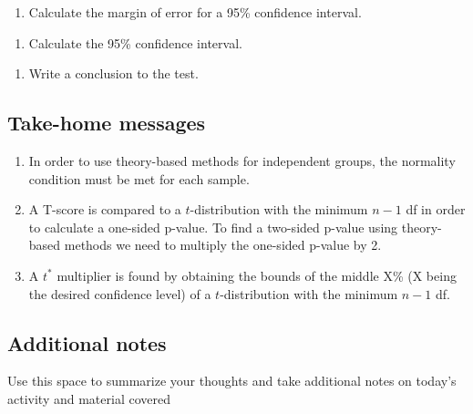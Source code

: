 \documentclass[
]{report}
\providecommand{\tightlist}{%
  \setlength{\itemsep}{0pt}\setlength{\parskip}{0pt}}
\begin{document}
\begin{enumerate}
\def\labelenumi{\arabic{enumi}.}
\setcounter{enumi}{8}
\tightlist
\item
  Calculate the margin of error for a 95\% confidence interval.
\end{enumerate}

\vspace{0.5in}

\begin{enumerate}
\def\labelenumi{\arabic{enumi}.}
\setcounter{enumi}{9}
\tightlist
\item
  Calculate the 95\% confidence interval.
\end{enumerate}

\vspace{0.6in}

\begin{enumerate}
\def\labelenumi{\arabic{enumi}.}
\setcounter{enumi}{10}
\tightlist
\item
  Write a conclusion to the test.
  \vspace{0.7in}
\end{enumerate}

\subsection{Take-home messages}\label{take-home-messages-1}

\begin{enumerate}
\def\labelenumi{\arabic{enumi}.}
\item
  In order to use theory-based methods for independent groups, the normality condition must be met for each sample.
\item
  A T-score is compared to a \(t\)-distribution with the minimum \(n - 1\) df in order to calculate a one-sided p-value. To find a two-sided p-value using theory-based methods we need to multiply the one-sided p-value by 2.
\item
  A \(t^*\) multiplier is found by obtaining the bounds of the middle X\% (X being the desired confidence level) of a \(t\)-distribution with the minimum \(n - 1\) df.
\end{enumerate}

\subsection{Additional notes}\label{additional-notes-1}

Use this space to summarize your thoughts and take additional notes on today's activity and material covered
\end{document}
